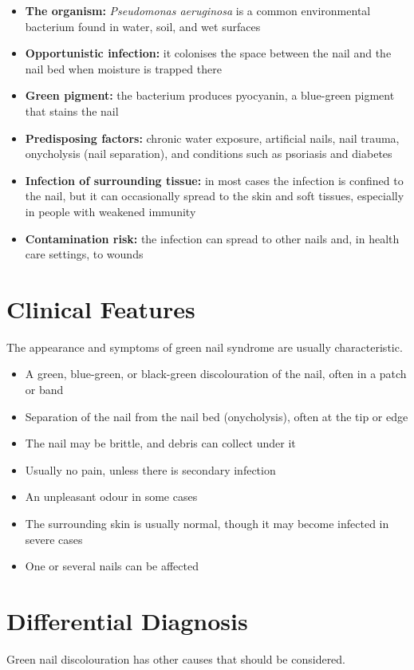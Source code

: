 \begin{itemize}
    \item \textbf{The organism:} \textit{Pseudomonas aeruginosa} is a common environmental bacterium found in water, soil, and wet surfaces
    \item \textbf{Opportunistic infection:} it colonises the space between the nail and the nail bed when moisture is trapped there
    \item \textbf{Green pigment:} the bacterium produces pyocyanin, a blue-green pigment that stains the nail
    \item \textbf{Predisposing factors:} chronic water exposure, artificial nails, nail trauma, onycholysis (nail separation), and conditions such as psoriasis and diabetes
    \item \textbf{Infection of surrounding tissue:} in most cases the infection is confined to the nail, but it can occasionally spread to the skin and soft tissues, especially in people with weakened immunity
    \item \textbf{Contamination risk:} the infection can spread to other nails and, in health care settings, to wounds
\end{itemize}

\section*{Clinical Features}
The appearance and symptoms of green nail syndrome are usually characteristic.

\begin{itemize}
    \item A green, blue-green, or black-green discolouration of the nail, often in a patch or band
    \item Separation of the nail from the nail bed (onycholysis), often at the tip or edge
    \item The nail may be brittle, and debris can collect under it
    \item Usually no pain, unless there is secondary infection
    \item An unpleasant odour in some cases
    \item The surrounding skin is usually normal, though it may become infected in severe cases
    \item One or several nails can be affected
\end{itemize}

\section*{Differential Diagnosis}
Green nail discolouration has other causes that should be considered.

